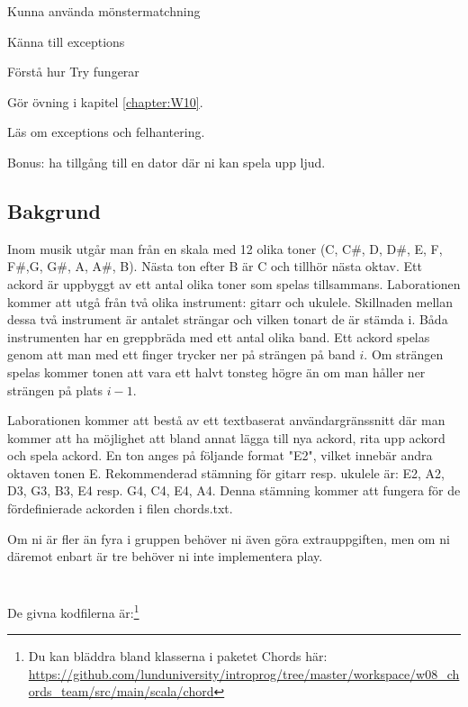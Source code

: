 

\Teamlab{\LabWeekTEN}

\begin{Goals}
\item Kunna använda mönstermatchning
\item Känna till exceptions
\item Förstå hur Try fungerar

\end{Goals}

\begin{Preparations}
\item Gör övning {\tt \ExeWeekTEN} i kapitel \ref{chapter:W10}.
\item Läs om exceptions och felhantering.
\item Bonus: ha tillgång till en dator där ni kan spela upp ljud.

\end{Preparations}

\subsection{Bakgrund}
Inom musik utgår man från en skala med 12 olika toner (C, C\#, D, D\#, E, F, F\#,G, G\#, A, A\#, B). Nästa ton efter B är C och tillhör nästa oktav. Ett ackord är uppbyggt av ett antal olika toner som spelas tillsammans. Laborationen kommer att utgå från två olika instrument: gitarr och ukulele. Skillnaden mellan dessa två instrument är antalet strängar och vilken tonart de är stämda i. Båda instrumenten har en greppbräda med ett antal olika band. Ett ackord spelas genom att man med ett finger trycker ner på strängen på band $i$. Om strängen spelas kommer tonen att vara ett halvt tonsteg högre än om man håller ner strängen på plats $i-1$.

Laborationen kommer att bestå av ett textbaserat användargränssnitt där man kommer att ha möjlighet att bland annat lägga till nya ackord, rita upp ackord och spela ackord. En ton anges på följande format "E2", vilket innebär andra oktaven tonen E. Rekommenderad stämning för gitarr resp. ukulele är: E2, A2, D3, G3, B3, E4 resp. G4, C4, E4, A4. Denna stämning kommer att fungera för de fördefinierade ackorden i filen chords.txt.

Om ni är fler än fyra i gruppen behöver ni även göra extrauppgiften, men om ni däremot enbart är tre behöver ni inte implementera play.
\\ \\ \\
De givna kodfilerna är:\footnote{Du kan bläddra bland klasserna i paketet Chords här: \\
\href{https://github.com/lunduniversity/introprog/tree/master/workspace/w08_chords_team/src/main/scala/chord}{\mbox{\fontsize{9}{11}\selectfont  https://github.com/lunduniversity/introprog/tree/master/workspace/w08\_chords\_team/src/main/scala/chord}}}

